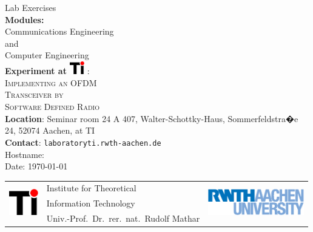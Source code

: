 \begin{titlepage}
{
\centering
{\Huge Lab Exercises}\\[15mm]
{\Large \textbf{Modules:}}\\[3mm]
{\Large Communications Engineering}\\[1mm]
{\Large and}\\[1mm] 
{\Large Computer Engineering}\\[20mm]
{\huge \textbf{Experiment at \includegraphics[height=16pt]{ti_veclogo}} :}\\[5mm]
{\huge \textsc{Implementing an OFDM}}\\[2mm]
{\huge \textsc{Transceiver by}}\\[2mm]
{\huge \textsc{Software Defined Radio}}\\[8mm]

{\textbf{Location}: Seminar room 24 A 407, Walter-Schottky-Haus, Sommerfeldstra�e 24, 52074 Aachen, at TI}\\[2mm]
{\textbf{Contact}: \texttt{laboratory\MVAt ti.rwth-aachen.de}}\\[30mm]

{\Large Hostname: \textbf{} }\\[6mm]
{\Large Date: \ddmmyyyydate \today}\\[30mm]
}

\begin{tabular}{@{}lll@{}}
\multirow{3}{37pt}{\includegraphics[height=32.3pt]{ti_veclogo}} & Institute for Theoretical & \multirow{3}{37pt}{\hspace*{-4cm}\includegraphics[height=32.3pt]{RWTHAachenUniversity}}\\
& Information Technology&\\
& Univ.-Prof.~Dr.~rer.~nat.~Rudolf Mathar\phantom{blablablablablablablabl}&
\end{tabular}
\end{titlepage}
\newpage

